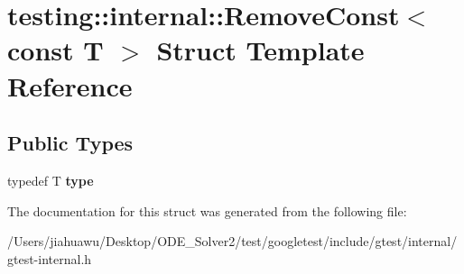 \hypertarget{structtesting_1_1internal_1_1_remove_const_3_01const_01_t_01_4}{}\section{testing\+:\+:internal\+:\+:Remove\+Const$<$ const T $>$ Struct Template Reference}
\label{structtesting_1_1internal_1_1_remove_const_3_01const_01_t_01_4}
\subsection*{Public Types}
\begin{DoxyCompactItemize}
\item 
\mbox{\label{structtesting_1_1internal_1_1_remove_const_3_01const_01_t_01_4_ac88c6824d228ab05091e5a4f1c1a95fc}} 
typedef T {\bfseries type}
\end{DoxyCompactItemize}


The documentation for this struct was generated from the following file\+:\begin{DoxyCompactItemize}
\item 
/\+Users/jiahuawu/\+Desktop/\+O\+D\+E\+\_\+\+Solver2/test/googletest/include/gtest/internal/gtest-\/internal.\+h\end{DoxyCompactItemize}
